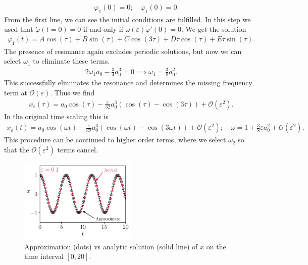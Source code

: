 \begin{ex}
\begin{subequations}
\begin{align}
			     &\phantom{:}\ \varphi_1(0)=0; \quad \dot{\varphi_1}(0) = 0. 
\end{align}\end{subequations}
From the first line, we can see the initial conditions are fulfilled. In this step we used that $\dot{\varphi}(t=0) = 0$ if and only if $\omega(\varepsilon)\varphi '(0) = 0$. We get the solution
\begin{align}
	\varphi_1(t) = A \cos(\tau) + B \sin(\tau) + C \cos(3\tau) + D\tau \cos(\tau) + E \tau \sin(\tau).
\end{align}
The presence of resonance again excludes periodic solutions, but now we can select $\omega_1$ to eliminate these terms.
\begin{align}
	2\omega_1 a_0 - \frac{3}{4} a_0 ^{3} = 0 \implies \boxed{\omega_1 = \frac{3}{8}a_0^{2}.}
\end{align}
This successfully eliminates the resonance and determines the missing frequency term at $\mathcal{O}(\varepsilon)$. Thus we find
\begin{align}
	x_\varepsilon(\tau) = a_0 \cos(\tau) - \frac{\varepsilon}{32}a_0^{3}\left( \cos(\tau) - \cos (3\tau) \right) + \mathcal{O}(\varepsilon^2).
\end{align}
In the original time scaling this is
\begin{align}
	x_\varepsilon (t) = a_0 \cos (\omega t) - \frac{\varepsilon}{32} a_0^3 \left( \cos(\omega t) - \cos(3\omega t)\right) + \mathcal{O}(\varepsilon^2); \quad \omega = 1+ \frac{3}{8}\varepsilon a_0^2 + \mathcal{O}(\varepsilon^2).	
\end{align}
This procedure can be continued to higher order terms, where we select $\omega_2$ so that the $\mathcal{O}(\varepsilon^2)$ terms cancel.
\begin{figure}[h!]
	\centering
	\includegraphics[width=0.5\textwidth]{figures/ch1/19approximation_accuracy.pdf}
	\caption{Approximation (dots) vs analytic solution (solid line) of $x$ on the time interval $[0,20]$.}
\end{figure}

\end{ex}

